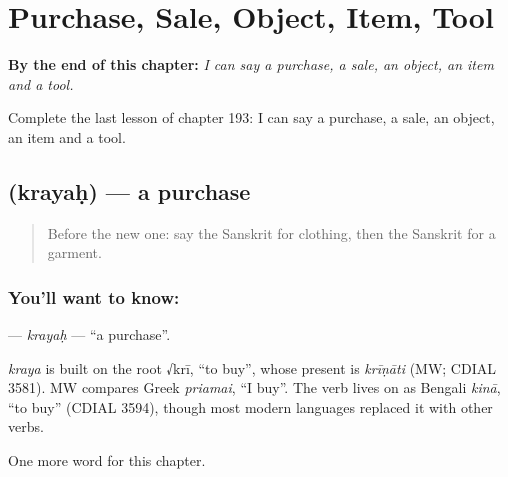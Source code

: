 
\chapter{Purchase, Sale, Object, Item, Tool}
\label{ch:sa-purchase-sale-object-item-tool}

\begin{chapteropening}
\textbf{By the end of this chapter:} \emph{I can say a purchase, a sale, an object, an item and a tool.}

Complete the last lesson of chapter 193: I can say a purchase, a sale, an object, an item and a tool.
\end{chapteropening}

\section[\texorpdfstring{\sk{क्रयः} (krayaḥ)}{क्रयः (krayaḥ)}]{ (krayaḥ) — a purchase}

\label{lesson:SA-C193-krayah}



\begin{quote}
Before the new one: say the Sanskrit for clothing, then the Sanskrit for a garment.
\end{quote}

\subsection*{You'll want to know: }
\textbf{} — \emph{krayaḥ} — \textquotedblleft{}a purchase\textquotedblright{}.

\begin{cousinweb}
\emph{kraya} is built on the root √krī, \textquotedblleft{}to buy\textquotedblright{}, whose present is \emph{krīṇāti} (MW; CDIAL 3581). MW compares Greek \emph{priamai}, \textquotedblleft{}I buy\textquotedblright{}. The verb lives on as Bengali \emph{kinā}, \textquotedblleft{}to buy\textquotedblright{} (CDIAL 3594), though most modern languages replaced it with other verbs.
\end{cousinweb}

\begin{grammarlens}[title={What you've built}]
One more word for this chapter.
\end{grammarlens}

